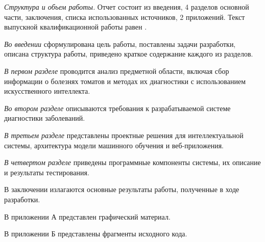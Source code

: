 \emph{Структура и объем работы.} Отчет состоит из введения, 4 разделов основной части, заключения, списка использованных источников, 2 приложений. Текст выпускной квалификационной работы равен .

\emph{Во введении} сформулирована цель работы, поставлены задачи разработки, описана структура работы, приведено краткое содержание каждого из разделов.

\emph{В первом разделе} проводится анализ предметной области, включая сбор информации о болезнях томатов и методах их диагностики с использованием искусственного интеллекта.

\emph{Во втором разделе} описываются требования к разрабатываемой системе диагностики заболеваний.

\emph{В третьем разделе} представлены проектные решения для интеллектуальной системы, архитектура модели машинного обучения и веб-приложения.

\emph{В четвертом разделе} приведены программные компоненты системы, их описание и результаты тестирования.

В заключении излагаются основные результаты работы, полученные в ходе разработки.

В приложении А представлен графический материал.

В приложении Б представлены фрагменты исходного кода. 
